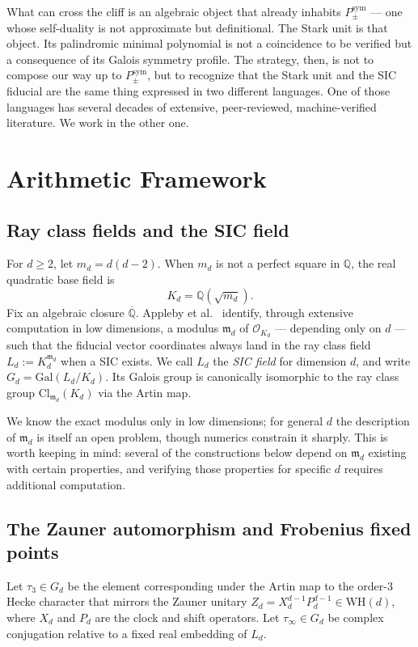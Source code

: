 \documentclass[12pt]{article}
\theoremstyle{plain}
\theoremstyle{definition}
\theoremstyle{remark}
\newcommand{\WH}{\mathrm{WH}}
\newcommand{\Gal}{\mathrm{Gal}}
\newcommand{\OO}{\mathcal{O}}
\newcommand{\bQ}{\mathbb{Q}}
\begin{document}
What can cross the cliff is an algebraic object that already inhabits $P_\pm^{\mathrm{sym}}$ — one whose self-duality is not approximate but definitional. The Stark unit is that object. Its palindromic minimal polynomial is not a coincidence to be verified but a consequence of its Galois symmetry profile. The strategy, then, is not to compose our way up to $P_\pm^{\mathrm{sym}}$, but to recognize that the Stark unit and the SIC fiducial are the same thing expressed in two different languages. One of those languages has several decades of extensive, peer-reviewed, machine-verified literature. We work in the other one.

\section{Arithmetic Framework}
\label{sec:arithmetic}

\subsection{Ray class fields and the SIC field}

For $d \geq 2$, let $m_d = d(d-2)$. When $m_d$ is not a perfect square in $\bQ$, the real quadratic base field is
\[
  K_d = \bQ(\sqrt{m_d}).
\]
Fix an algebraic closure $\overline{\bQ}$. Appleby et al.\ \cite{afmy2017} identify, through extensive computation in low dimensions, a modulus $\mathfrak{m}_d$ of $\OO_{K_d}$ — depending only on $d$ — such that the fiducial vector coordinates always land in the ray class field $L_d := K_d^{\mathfrak{m}_d}$ when a SIC exists. We call $L_d$ the \emph{SIC field} for dimension $d$, and write $G_d = \Gal(L_d / K_d)$. Its Galois group is canonically isomorphic to the ray class group $\mathrm{Cl}_{\mathfrak{m}_d}(K_d)$ via the Artin map.

We know the exact modulus only in low dimensions; for general $d$ the description of $\mathfrak{m}_d$ is itself an open problem, though numerics constrain it sharply. This is worth keeping in mind: several of the constructions below depend on $\mathfrak{m}_d$ existing with certain properties, and verifying those properties for specific $d$ requires additional computation.

\subsection{The Zauner automorphism and Frobenius fixed points}

Let $\tau_3 \in G_d$ be the element corresponding under the Artin map to the order-3 Hecke character that mirrors the Zauner unitary $Z_d = X_d^{d-1} P_d^{d-1} \in \WH(d)$, where $X_d$ and $P_d$ are the clock and shift operators. Let $\tau_\infty \in G_d$ be complex conjugation relative to a fixed real embedding of $L_d$.
\end{document}
